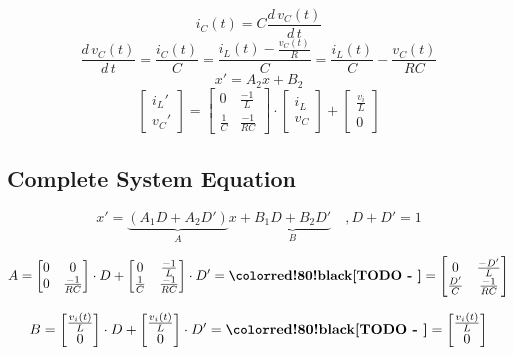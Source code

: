 \[
	i_C(t) 
	= C \frac{d\,v_C(t)}{d\,t}
\]
\[
	\frac{d\,v_C(t)}{d\,t}
	= \frac{i_C(t)}{C}
	= \frac{i_L(t) - \frac{v_C(t)}{R}}{C}
	= \frac{i_L(t)}{C} - \frac{v_C(t)}{R C}
\]
\[
	x'  = A_2 x + B_2
\]
\[
	\begin{bmatrix}
		{i_L}' \\
		{v_C}'
	\end{bmatrix}
	=
	\begin{bmatrix}
		0 		& \frac{-1}{L} \\
		\frac{1}{C}	& \frac{-1}{R C}
	\end{bmatrix}
	\cdot
	\begin{bmatrix}
		i_L \\
		v_C
	\end{bmatrix}
	+
	\begin{bmatrix}
		\frac{v_i}{L} \\
		0
	\end{bmatrix}
\]

\subsection{Complete System Equation}

\[
	x' = \underbrace{(A_1 D + A_2 D')}_{A} x + \underbrace{B_1 D + B_2 D'}_{B} \quad, D + D' = 1
\]

\[
	A
	=
	\begin{bmatrix}
		0 & 0 \\
		0 & \frac{-1}{R C}
	\end{bmatrix}
	\cdot D
	+
	\begin{bmatrix}
		0 		& \frac{-1}{L} \\
		\frac{1}{C} 	& \frac{-1}{R C}
	\end{bmatrix}
	\cdot D'
	= \mathrm{\todo{}}
	=
	\begin{bmatrix}
		0		& \frac{-D'}{L} \\
		\frac{D'}{C}	& \frac{-1}{R C}
	\end{bmatrix}
\]

\[
	B
	= 
	\begin{bmatrix}
		\frac{v_i(t)}{L} \\
		0
	\end{bmatrix}
	\cdot D
	+
	\begin{bmatrix}
		\frac{v_i(t)}{L} \\
		0
	\end{bmatrix}
	\cdot D'
	= \mathrm{\todo{}}
	=
	\begin{bmatrix}
		\frac{v_i(t)}{L} \\
		0
	\end{bmatrix}
\]

